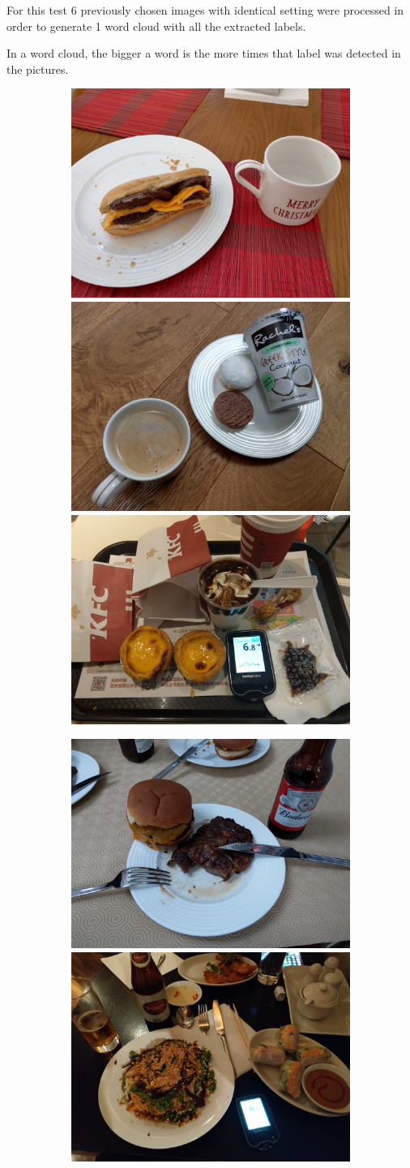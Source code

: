     For this test 6 previously chosen images with identical setting were processed in order to generate 1 word cloud with all the extracted labels.
    
    In a word cloud, the bigger a word is the more times that label was detected in the pictures.


    \begin{figure}[H]
      \begin{subfigure}{\linewidth}
      \includegraphics[width=.3\linewidth]{Sections/4InitialWork/4_images_wordcloud/photo1.jpg}\hfill
      \includegraphics[width=.3\linewidth]{Sections/4InitialWork/4_images_wordcloud/photo2.jpg}\hfill
      \includegraphics[width=.3\linewidth]{Sections/4InitialWork/4_images_wordcloud/photo7.jpg}
      \end{subfigure}\par\medskip
      \begin{subfigure}{\linewidth}
      \includegraphics[width=.3\linewidth]{Sections/4InitialWork/4_images_wordcloud/photo4.jpg}\hfill
      \includegraphics[width=.3\linewidth]{Sections/4InitialWork/4_images_wordcloud/photo5.jpg}\hfill

\end{subfigure}
\end{figure}
